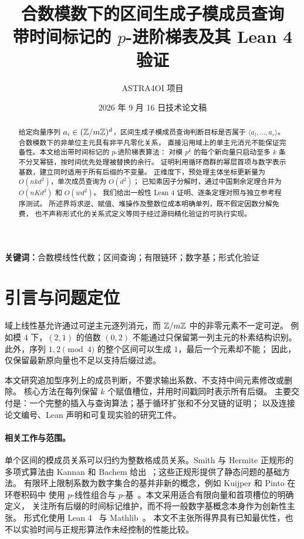 \documentclass[11pt,a4paper,fontset=fandol]{ctexart}
\title{合数模数下的区间生成子模成员查询\\[0.4em]\large 带时间标记的 $p$-进阶梯表及其 Lean 4 验证}
\author{ASTRA4OI 项目}
\date{2026 年 9 月 16 日\quad 技术论文稿}
\theoremstyle{definition}
\theoremstyle{plain}
\begin{document}
\maketitle
\begin{abstract}
给定向量序列 $a_i\in(\mathbb Z/m\mathbb Z)^d$，区间生成子模成员查询判断目标是否属于
$\langle a_l,\ldots,a_r\rangle$。合数模数下的非单位主元具有非平凡零化关系，
直接沿用域上的单主元消元不能保证完备性。本文给出带时间标记的 $p$-进阶梯表算法：
对模 $p^k$ 的每个新向量只启动至多 $k$ 条不分叉幂链，按时间优先处理被替换的余行。
证明利用循环商群的幂层首项与数字表示基数，建立同时适用于所有后缀的不变量。
正维度下，预处理主体坐标更新量为 $O(nkd^2)$，单次成员查询为 $O(d^2)$；
已知素因子分解时，通过中国剩余定理合并为 $O(nKd^2)$ 和 $O(wd^2)$。
我们给出一般性 Lean 4 证明、逐条定理对照与独立参考程序测试。
所述界将求逆、赋值、堆操作及整数位成本明确单列，既不假定因数分解免费，
也不声称形式化的关系式定义等同于经过源码精化验证的可执行实现。
\end{abstract}
\noindent\textbf{关键词：}合数模线性代数；区间查询；有限链环；数字基；形式化验证

\section{引言与问题定位}
域上线性基允许通过可逆主元逐列消元，而 $\mathbb Z/m\mathbb Z$ 中的非零元素不一定可逆。
例如模 $4$ 下，$(2,1)$ 的倍数 $(0,2)$ 不能通过只保留第一列主元的朴素结构识别。
此外，序列 $1,2\pmod4$ 的整个区间可以生成 $1$，最后一个元素却不能；
因此，仅保留最新原向量也不足以支持后缀过滤。

本文研究追加型序列上的成员判断，不要求输出系数、不支持中间元素修改或删除。
核心方法在每列保留 $k$ 个赋值槽位，并用时间戳同时表示所有后缀。
主要交付是：一个完整的插入与查询算法；基于循环扩张和不分叉链的证明；
以及连接论文编号、Lean 声明和可复现实验的研究工件。

\paragraph{相关工作与范围。}
单个区间的模成员关系可以归约为整数格成员关系。Smith 与 Hermite 正规形的
多项式算法由 Kannan 和 Bachem 给出~\cite{kannan1979}；这些正规形提供了静态问题的基础方法。
有限环上限制系数为数字集合的基并非新的概念，例如 Kuijper 和 Pinto 在环卷积码中
使用 $p$-线性组合与 $p$-基~\cite{kuijper2009}。本文采用适合有限向量和首项槽位的明确定义，
关注所有后缀的时间标记维护，而不将一般数字基概念本身作为创新性主张。
形式化使用 Lean 4~\cite{demoura2021} 与 Mathlib~\cite{mathlib2020}。
本文不主张所得界具有已知最优性，也不以实验时间与正规形算法作未经控制的性能比较。
\end{document}
